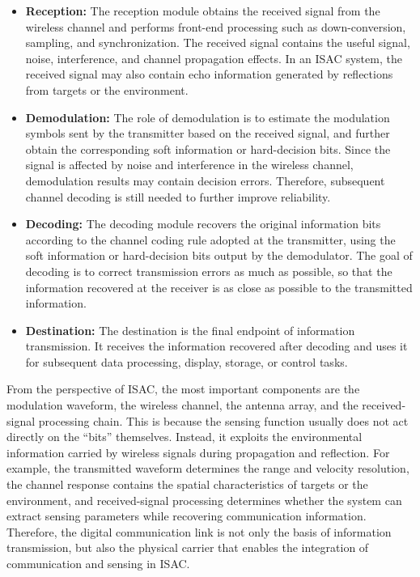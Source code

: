 \begin{itemize}
    \item \textbf{Reception:}
    The reception module obtains the received signal from the wireless channel
    and performs front-end processing such as down-conversion,
sampling,
and synchronization.
    The received signal contains the useful signal,
noise,
interference,
and channel propagation effects.
    In an ISAC system,
    the received signal may also contain echo information generated by reflections from targets or the environment.

    \item \textbf{Demodulation:}
    The role of demodulation is to estimate the modulation symbols sent by the transmitter
    based on the received signal,
    and further obtain the corresponding soft information or hard-decision bits.
    Since the signal is affected by noise and interference in the wireless channel,
    demodulation results may contain decision errors.
    Therefore,
    subsequent channel decoding is still needed to further improve reliability.

    \item \textbf{Decoding:}
    The decoding module recovers the original information bits according to the channel coding rule
    adopted at the transmitter,
    using the soft information or hard-decision bits output by the demodulator.
    The goal of decoding is to correct transmission errors as much as possible,
    so that the information recovered at the receiver is as close as possible to the transmitted information.

    \item \textbf{Destination:}
    The destination is the final endpoint of information transmission.
    It receives the information recovered after decoding
    and uses it for subsequent data processing,
display,
storage,
or control tasks.
\end{itemize}
From the perspective of ISAC,
the most important components are the modulation waveform,
the wireless channel,
the antenna array,
and the received-signal processing chain.
This is because the sensing function usually does not act directly on the ``bits'' themselves.
Instead,
it exploits the environmental information carried by wireless signals during propagation and reflection.
For example,
the transmitted waveform determines the range and velocity resolution,
the channel response contains the spatial characteristics of targets or the environment,
and received-signal processing determines whether the system can extract sensing parameters
while recovering communication information.
Therefore,
the digital communication link is not only the basis of information transmission,
but also the physical carrier that enables the integration of communication and sensing in ISAC.


